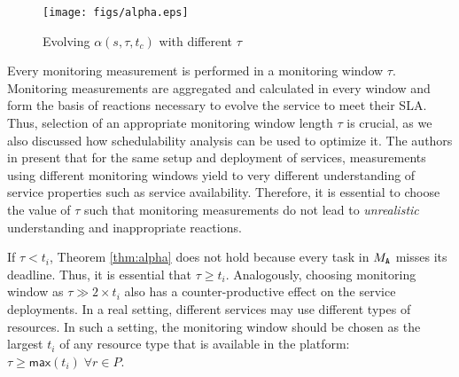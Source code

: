 % 
\begin{wrapfigure}{r}{0.6\textwidth}
\begin{center}
\texttt{[image: figs/alpha.eps]}  
\end{center}
\caption{{\scriptsize Evolving $\alpha(s,\tau,t_c)$ with different $\tau$}}
\label{fig:alpha}
\end{wrapfigure}
%
Every monitoring measurement is performed in a monitoring window $\tau$.
Monitoring measurements are aggregated and calculated in every window and form the basis of reactions necessary to evolve the service to meet their SLA.
Thus, selection of an appropriate monitoring window length $\tau$ is crucial, as we also discussed how schedulability analysis can be used to optimize it.
The authors in \cite{hogben2013defavail} present that for the same setup and deployment of services, measurements using different monitoring windows yield to very different understanding of service properties such as service availability.
Therefore, it is essential to choose the value of $\tau$ such that monitoring measurements do not lead to \emph{unrealistic} understanding and inappropriate reactions.

If $\tau < t_i$, Theorem \ref{thm:alpha} does not hold because every task  in $M_{{\scriptsize\texttt{A}}}$ misses its deadline.
Thus, it is essential that $\tau \geq t_i$.
Analogously, choosing monitoring window as $\tau \gg 2 \times t_i$ also has a counter-productive effect on the service deployments.
% 
In a real setting, different services may use different types of resources.
In such a setting, the monitoring window should be chosen as the largest $t_i$ of any resource type that is available in the platform: $\tau \geq \mathsf{max}(t_i) \; \forall r \in P$.


